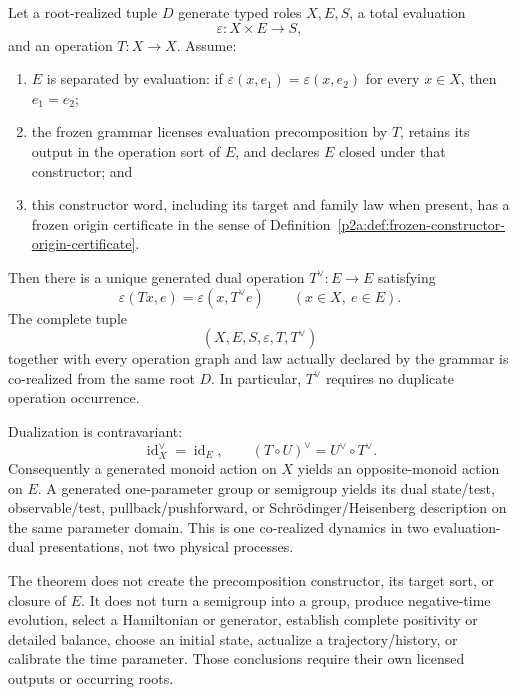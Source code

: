 \documentclass[12pt,a4paper]{article}
\begin{document}
\begin{theorem}
\label{p2a:thm:evaluation-dual-corealization}
Let a root-realized tuple \(D\) generate typed roles \(X,E,S\), a total
evaluation
\[
 \varepsilon:X\times E\longrightarrow S,
\]
and an operation \(T:X\to X\).  Assume:
\begin{enumerate}[label=(\roman*),leftmargin=2em]
\item \(E\) is separated by evaluation: if
      \(\varepsilon(x,e_1)=\varepsilon(x,e_2)\) for every \(x\in X\), then
      \(e_1=e_2\);
\item the frozen grammar licenses evaluation precomposition by \(T\), retains
      its output in the operation sort of \(E\), and declares \(E\) closed
      under that constructor; and
\item this constructor word, including its target and family law when
      present, has a frozen origin certificate in the sense of
      Definition~\ref{p2a:def:frozen-constructor-origin-certificate}.
\end{enumerate}
Then there is a unique generated dual operation \(T^\vee:E\to E\) satisfying
\[
 \boxed{\varepsilon(Tx,e)=\varepsilon(x,T^\vee e)}
 \qquad(x\in X,\ e\in E).
\]
The complete tuple
\[
 (X,E,S,\varepsilon,T,T^\vee)
\]
together with every operation graph and law actually declared by the grammar
is co-realized from the same root \(D\).  In particular, \(T^\vee\) requires
no duplicate operation occurrence.

Dualization is contravariant:
\[
 \operatorname{id}_X^\vee=\operatorname{id}_E,
 \qquad
 (T\circ U)^\vee=U^\vee\circ T^\vee.
\]
Consequently a generated monoid action on \(X\) yields an opposite-monoid
action on \(E\).  A generated one-parameter group or semigroup yields its
dual state/test, observable/test, pullback/pushforward, or
Schrödinger/Heisenberg description on the same parameter domain.  This is one
co-realized dynamics in two evaluation-dual presentations, not two physical
processes.

The theorem does not create the precomposition constructor, its target sort,
or closure of \(E\).  It does not turn a semigroup into a group, produce
negative-time evolution, select a Hamiltonian or generator, establish
complete positivity or detailed balance, choose an initial state, actualize a
trajectory/history, or calibrate the time parameter.  Those conclusions
require their own licensed outputs or occurring roots.
\end{theorem}
\end{document}
